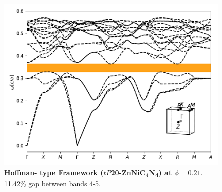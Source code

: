\documentclass[fleqn,amsmath,amssymb,superscriptaddress, reprint,prl]{revtex4-1}
\begin{document}
\begin{figure}
\includegraphics[width=0.9\linewidth]{workspace/4c49cf5c6c9208992a00118b17f53100/images/r=18.pdf}
	\caption{\textbf{Hoffman- type Framework ($tP$20-ZnNiC\textsubscript{4}N\textsubscript{4}) at $\phi=0.21$}. 11.42\% gap between bands 4-5.}
\end{figure}
\end{document}
